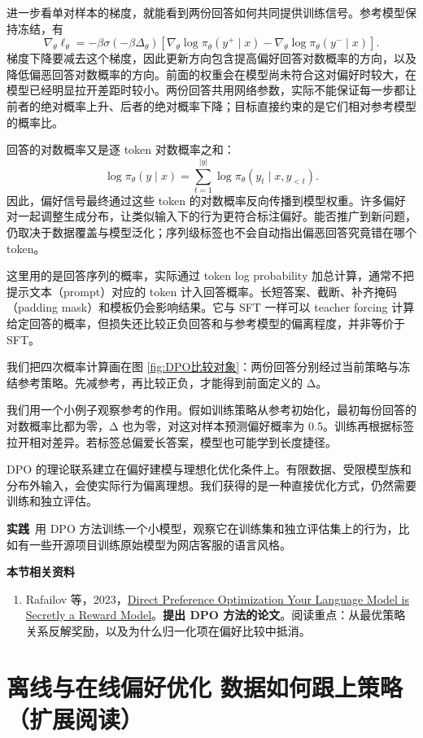 进一步看单对样本的梯度，就能看到两份回答如何共同提供训练信号。参考模型保持冻结，有
\[
\nabla_\theta\ell_\theta
=-\beta\sigma(-\beta\Delta_\theta)
\left[\nabla_\theta\log\pi_\theta(y^+\mid x)
-\nabla_\theta\log\pi_\theta(y^-\mid x)\right].
\]
梯度下降要减去这个梯度，因此更新方向包含提高偏好回答对数概率的方向，以及降低偏恶回答对数概率的方向。前面的权重会在模型尚未符合这对偏好时较大，在模型已经明显拉开差距时较小。两份回答共用网络参数，实际不能保证每一步都让前者的绝对概率上升、后者的绝对概率下降；目标直接约束的是它们相对参考模型的概率比。

回答的对数概率又是逐 token 对数概率之和：
\[
\log\pi_\theta(y\mid x)
=\sum_{t=1}^{|y|}\log\pi_\theta(y_t\mid x,y_{<t}).
\]
因此，偏好信号最终通过这些 token 的对数概率反向传播到模型权重。许多偏好对一起调整生成分布，让类似输入下的行为更符合标注偏好。能否推广到新问题，仍取决于数据覆盖与模型泛化；序列级标签也不会自动指出偏恶回答究竟错在哪个 token。

这里用的是回答序列的概率，实际通过 token log probability 加总计算，通常不把提示文本（prompt）对应的 token 计入回答概率。长短答案、截断、补齐掩码（padding mask）和模板仍会影响结果。它与 SFT 一样可以 teacher forcing 计算给定回答的概率，但损失还比较正负回答和与参考模型的偏离程度，并非等价于 SFT。

我们把四次概率计算画在图 \ref{fig:DPO比较对象}：两份回答分别经过当前策略与冻结参考策略。先减参考，再比较正负，才能得到前面定义的 Δ。

我们用一个小例子观察参考的作用。假如训练策略从参考初始化，最初每份回答的对数概率比都为零，Δ 也为零，对这对样本预测偏好概率为 0.5。训练再根据标签拉开相对差异。若标签总偏爱长答案，模型也可能学到长度捷径。

DPO 的理论联系建立在偏好建模与理想化优化条件上。有限数据、受限模型族和分布外输入，会使实际行为偏离理想。我们获得的是一种直接优化方式，仍然需要训练和独立评估。

\textbf{实践}~用 DPO 方法训练一个小模型，观察它在训练集和独立评估集上的行为，比如有一些开源项目训练原始模型为网店客服的语言风格。

\textbf{本节相关资料}
\begin{enumerate}
    \item Rafailov 等，2023，\href{https://arxiv.org/abs/2305.18290}{Direct Preference Optimization Your Language Model is Secretly a Reward Model}。\textbf{提出 DPO 方法的论文}。阅读重点：从最优策略关系反解奖励，以及为什么归一化项在偏好比较中抵消。
\end{enumerate}

\section{离线与在线偏好优化 数据如何跟上策略（扩展阅读）}\label{离线与在线偏好优化 数据如何跟上策略}

